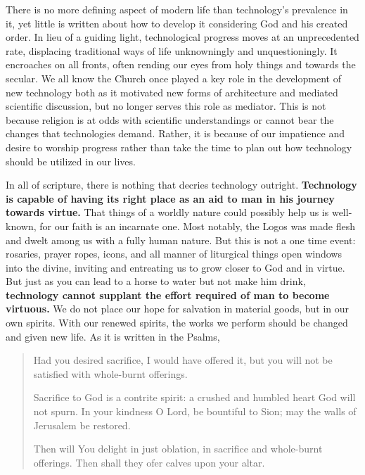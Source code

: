\documentclass[letterpaper]{article}
\begin{document}
There is no more defining aspect of modern life than technology's prevalence in it, yet little is written about how to develop it considering God and his created order. In lieu of a guiding light, technological progress moves at an unprecedented rate, displacing traditional ways of life unknowningly and unquestioningly. It encroaches on all fronts, often rending our eyes from holy things and towards the secular. We all know the Church once played a key role in the development of new technology both as it motivated new forms of architecture and mediated scientific discussion, but no longer serves this role as mediator. This is not because religion is at odds with scientific understandings or cannot bear the changes that technologies demand. Rather, it is because of our impatience and desire to worship progress rather than take the time to plan out how technology should be utilized in our lives.


In all of scripture, there is nothing that decries technology outright. \textbf{Technology is capable of having its right place as an aid to man in his journey towards virtue.} That things of a worldly nature could possibly help us is well-known, for our faith is an incarnate one. Most notably, the Logos was made flesh and dwelt among us with a fully human nature. But this is not a one time event: rosaries, prayer ropes, icons, and all manner of liturgical things open windows into the divine, inviting and entreating us to grow closer to God and in virtue. But just as you can lead to a horse to water but not make him drink, \textbf{technology cannot supplant the effort required of man to become virtuous.} We do not place our hope for salvation in material goods, but in our own spirits. With our renewed spirits, the works we perform should be changed and given new life. As it is written in the Psalms,

\begin{quote}
  Had you desired sacrifice, I would have offered it,
  but you will not be satisfied with whole-burnt offerings.

  Sacrifice to God is a contrite spirit:
  a crushed and humbled heart God will not spurn.
  In your kindness O Lord, be bountiful to Sion;
  may the walls of Jerusalem be restored.

  Then will You delight in just oblation,
  in sacrifice and whole-burnt offerings.
  Then shall they ofer calves upon your altar.
\end{quote}
\end{document}
